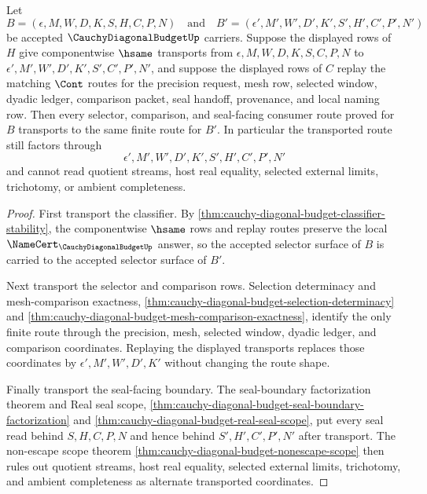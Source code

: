 \begin{theorem}
\label{thm:cauchy-diagonal-budget-transported-selector-naturality}
Let
$$
B=(\epsilon,M,W,D,K,S,H,C,P,N)
\quad\text{and}\quad
B'=(\epsilon',M',W',D',K',S',H',C',P',N')
$$
be accepted $\CauchyDiagonalBudgetUp$ carriers. Suppose the displayed rows of $H$ give componentwise $\hsame$ transports from $\epsilon,M,W,D,K,S,C,P,N$ to $\epsilon',M',W',D',K',S',C',P',N'$, and suppose the displayed rows of $C$ replay the matching $\Cont$ routes for the precision request, mesh row, selected window, dyadic ledger, comparison packet, seal handoff, provenance, and local naming row. Then every selector, comparison, and seal-facing consumer route proved for $B$ transports to the same finite route for $B'$. In particular the transported route still factors through
$$
\epsilon',M',W',D',K',S',H',C',P',N'
$$
and cannot read quotient streams, host real equality, selected external limits, trichotomy, or ambient completeness.
\end{theorem}
\begin{proof}
First transport the classifier. By \autoref{thm:cauchy-diagonal-budget-classifier-stability}, the componentwise $\hsame$ rows and replay routes preserve the local $\NameCert_{\CauchyDiagonalBudgetUp}$ answer, so the accepted selector surface of $B$ is carried to the accepted selector surface of $B'$.

Next transport the selector and comparison rows. Selection determinacy and mesh-comparison exactness, \autoref{thm:cauchy-diagonal-budget-selection-determinacy} and \autoref{thm:cauchy-diagonal-budget-mesh-comparison-exactness}, identify the only finite route through the precision, mesh, selected window, dyadic ledger, and comparison coordinates. Replaying the displayed transports replaces those coordinates by $\epsilon',M',W',D',K'$ without changing the route shape.

Finally transport the seal-facing boundary. The seal-boundary factorization theorem and Real seal scope, \autoref{thm:cauchy-diagonal-budget-seal-boundary-factorization} and \autoref{thm:cauchy-diagonal-budget-real-seal-scope}, put every seal read behind $S,H,C,P,N$ and hence behind $S',H',C',P',N'$ after transport. The non-escape scope theorem \autoref{thm:cauchy-diagonal-budget-nonescape-scope} then rules out quotient streams, host real equality, selected external limits, trichotomy, and ambient completeness as alternate transported coordinates.
\end{proof}

